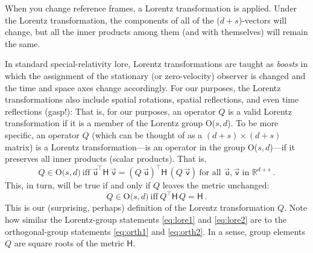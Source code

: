 \documentclass{article}
\newcommand{\metric}{\mathsf{H}}
\newcommand\upvec[1]{\!\vec{\,\mathrm{#1}}}
\newcommand{\Lvec}[1]{\upvec{\mathsf{#1}}} %
\newcommand{\plus}{\!+\!} %
\begin{document}
When you change reference frames, a Lorentz transformation is applied.
Under the Lorentz transformation, the components of all of the ($d\plus s$)-vectors will change, but all the inner products among them (and with themselves) will remain the same.

In standard special-relativity lore, Lorentz transformations are taught as \emph{boosts} in which the assignment of the stationary (or zero-velocity) observer is changed and the time and space axes change accordingly.
For our purposes, the Lorentz transformations also include spatial rotations, spatial reflections, and even time reflections (gasp!):
That is, for our purposes, an operator $Q$ is a valid Lorentz transformation if it is a member of the Lorentz group O($s,d$).
To be more specific, an operator $Q$ (which can be thought of as a $(d+s)\times(d+s)$ matrix) is a Lorentz transformation---is an operator in the group O($s,d$)---if it preserves all inner products (scalar products). 
That is,
\begin{equation}
    Q \in \mbox{O($s,d$)} ~ \mbox{iff} ~ \Lvec{u}^\top\metric\,\Lvec{v}=(Q\,\Lvec{u})^\top\metric\,(Q\,\Lvec{v}) ~ \mbox{for all $\Lvec{u},\Lvec{v}$ in $\mathbb{R}^{d+s}$} ~.\label{eq:lore1}
\end{equation}
This, in turn, will be true if and only if $Q$ leaves the metric unchanged:
\begin{equation}
    Q \in \mbox{O($s,d$)} ~ \mbox{iff} ~ Q^\top\metric\,Q=\metric ~.\label{eq:lore2}
\end{equation}
This is our (surprising, perhaps) definition of the Lorentz transformation $Q$.
Note how similar the Lorentz-group statements \eqref{eq:lore1} and \eqref{eq:lore2} are to the orthogonal-group statements \eqref{eq:orth1} and \eqref{eq:orth2}.
In a sense, group elements $Q$ are square roots of the metric $\metric$.
\end{document}
